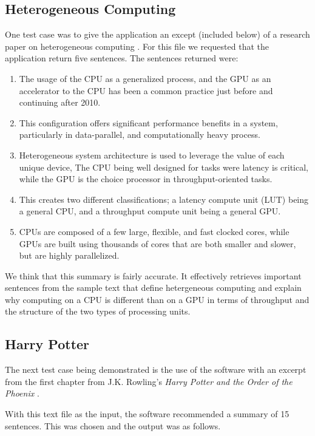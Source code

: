 \subsection{Heterogeneous Computing}\label{sec:het}
One test case was to give the application an except (included below) of a research paper on heterogeneous computing \cite{noahpaper}.
For this file we requested that the application return five sentences. The sentences returned were:
\begin{enumerate}
	\item The usage of the CPU as a generalized process, and the GPU as an accelerator to the CPU has been a common practice just before and continuing after 2010.
	\item This configuration offers significant performance benefits in a system, particularly in data-parallel, and computationally heavy process.
	\item Heterogeneous system architecture is used to leverage the value of each unique device, The CPU being well designed for tasks were latency is critical, while the GPU is the choice processor in throughput-oriented tasks.
	\item This creates two different classifications; a latency compute unit (LUT) being a general CPU, and a throughput compute unit being a general GPU.
	\item CPUs are composed of a few large, flexible, and fast clocked cores, while GPUs are built using thousands of cores that are both smaller and slower, but are highly parallelized.
\end{enumerate}

We think that this summary is fairly accurate. It effectively retrieves important sentences from the sample text that define hetergeneous computing and explain why computing on a CPU is different than on a GPU in terms of throughput and the structure of the two types of processing units.

\subsection{Harry Potter}
The next test case being demonstrated is the use of the software with an excerpt from the first chapter from J.K. Rowling's {\em Harry Potter and the Order of the Phoenix} \cite{harrypotter}.

With this text file as the input, the software recommended a summary of 15 sentences. This was chosen and the output was as follows.

